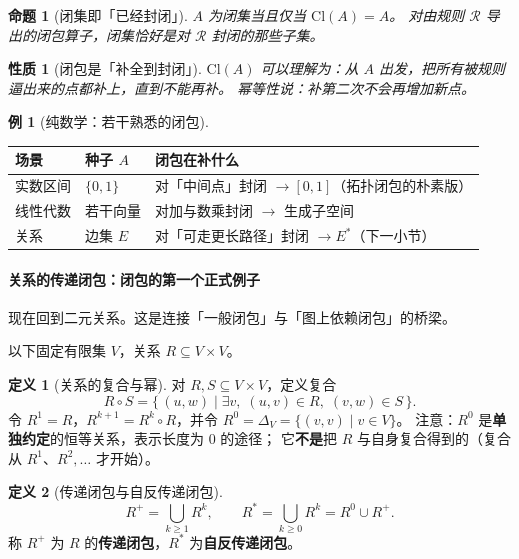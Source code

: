 \documentclass[UTF8,a4paper,11pt]{ctexart}
\theoremstyle{definition}
\newtheorem{definition}{定义}[section]
\newtheorem{example}{例}[section]
\theoremstyle{plain}
\newtheorem{proposition}{命题}[section]
\newtheorem{property}{性质}[section]
\theoremstyle{remark}
\numberwithin{figure}{section}
\numberwithin{table}{section}
\begin{document}
\begin{proposition}[闭集即「已经封闭」]
$A$ 为闭集当且仅当 $\mathrm{Cl}(A)=A$。
对由规则 $\mathcal{R}$ 导出的闭包算子，闭集恰好是对 $\mathcal{R}$ 封闭的那些子集。
\end{proposition}

\begin{property}[闭包是「补全到封闭」]
$\mathrm{Cl}(A)$ 可以理解为：从 $A$ 出发，把所有被规则逼出来的点都补上，直到不能再补。
幂等性说：补第二次不会再增加新点。
\end{property}

\begin{example}[纯数学：若干熟悉的闭包]
\begin{center}
\begin{tabular}{@{}L{3.2cm}L{5.0cm}L{5.2cm}@{}}
  \toprule
  场景 & 种子 $A$ & 闭包在补什么 \\
  \midrule
  实数区间 & $\{0,1\}$ & 对「中间点」封闭 $\to [0,1]$（拓扑闭包的朴素版） \\
  线性代数 & 若干向量 & 对加与数乘封闭 $\to$ 生成子空间 \\
  关系 & 边集 $E$ & 对「可走更长路径」封闭 $\to E^{*}$（下一小节） \\
  \bottomrule
\end{tabular}
\end{center}
\end{example}

\paragraph{关系的传递闭包：闭包的第一个正式例子}

现在回到二元关系。这是连接「一般闭包」与「图上依赖闭包」的桥梁。

以下固定有限集 $V$，关系 $R\subseteq V\times V$。

\begin{definition}[关系的复合与幂]
对 $R,S\subseteq V\times V$，定义复合
\[
R\circ S=\{\,(u,w)\mid \exists v,\;(u,v)\in R,\;(v,w)\in S\,\}.
\]
令 $R^{1}=R$，$R^{k+1}=R^{k}\circ R$，并令 $R^{0}=\Delta_V=\{(v,v)\mid v\in V\}$。
注意：$R^{0}$ 是\textbf{单独约定}的恒等关系，表示长度为 $0$ 的途径；
它\textbf{不是}把 $R$ 与自身复合得到的（复合从 $R^{1}$、$R^{2},\ldots$ 才开始）。
\end{definition}

\begin{definition}[传递闭包与自反传递闭包]
\[
R^{+}=\bigcup_{k\ge 1}R^{k},
\qquad
R^{*}=\bigcup_{k\ge 0}R^{k}=R^{0}\cup R^{+}.
\]
称 $R^{+}$ 为 $R$ 的\textbf{传递闭包}，$R^{*}$ 为\textbf{自反传递闭包}。
\end{definition}
\end{document}
